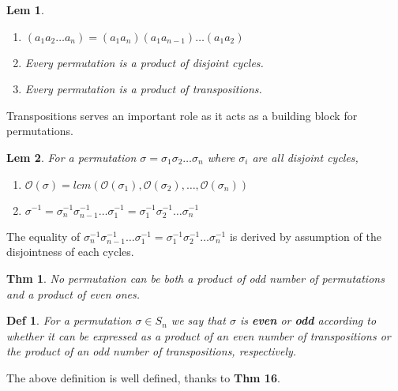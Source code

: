 \documentclass[paper=a4, fontsize=11pt]{scrartcl}
\newcommand{\nextline}{$ $ \newline \vspace{-0.15in}}
\newtheorem{theorem}{Thm}
\newtheorem{definition}{Def}
\newtheorem{lemma}{Lem}
\begin{document}
\begin{lemma}
\nextline
\begin{enumerate}
	\item $(a_1 a_2 \dots a_n) = (a_1 a_n) (a_1 a_{n-1}) \dots (a_1 a_2)$
	\item Every permutation is a product of disjoint cycles.
	\item Every permutation is a product of transpositions.\\
\end{enumerate}
\end{lemma}

Transpositions serves an important role as it acts as a building block for permutations.\\

\begin{lemma}
	For a permutation $\sigma = \sigma_1 \sigma_2 \dots \sigma_n$ where $\sigma_i$ are all disjoint cycles, 
	\begin{enumerate}[label=\arabic*)]
		\item $\mathcal{O}(\sigma) = lcm \left( \mathcal{O}(\sigma_1) , \mathcal{O}(\sigma_2) , \dots, \mathcal{O}(\sigma_n) \right)$
		\item $\sigma^{-1}=\sigma_n^{-1} \sigma_{n-1}^{-1} \dots \sigma_1^{-1} = \sigma_1^{-1}\sigma_2^{-1} \dots \sigma_n^{-1}$\\
	\end{enumerate}
\end{lemma}

The equality of $\sigma_n^{-1} \sigma_{n-1}^{-1} \dots \sigma_1^{-1} = \sigma_1^{-1}\sigma_2^{-1} \dots \sigma_n^{-1}$ is derived by assumption of the disjointness of each cycles.\\

\begin{theorem}
	No permutation can be both a product of odd number of permutations and a product of even ones.\\
\end{theorem}

\begin{definition}
	For a permutation $\sigma \in S_n$ we say that $\sigma$ is \textbf{even} or \textbf{odd} according to whether it can be expressed as a product of an even number of transpositions or the product of an odd number of transpositions, respectively.\\ 
\end{definition}

The above definition is well defined, thanks to \textbf{Thm 16}.\\
\end{document}
